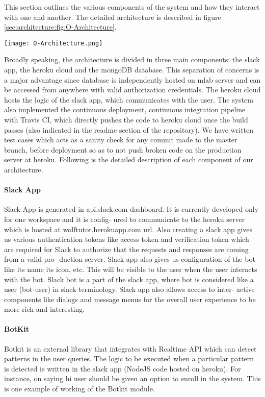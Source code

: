 This section outlines the various components of the system and how they interact with one and another. The detailed architecture is described in figure \ref{sec:architecture:fig:O-Architecture}.

\begin{figure*}[ht]
\label{sec:architecture:fig:O-Architecture}
\caption{Original Architecture Design}
\centering
\texttt{[image: O-Architecture.png]}
\end{figure*}

Broadly speaking, the architecture is divided in three main components: the slack app, the heroku cloud and the mongoDB database. This separation of concerns is a major advantage since database is independently hosted on mlab server and can be accessed from anywhere with valid authorization credentials. The heroku cloud hosts the logic of the slack app, which communicates with the user. The system also implemented the continuous deployment, continuous integration pipeline with Travis CI, which directly pushes the code to heroku cloud once the build passes (also indicated in the readme section of the repository). We have written test cases which acts as a sanity check for any commit made to the master branch, before deployment so as to not push broken code on the production server at heroku. Following is the detailed description of each component of our architecture.

\paragraph{Slack App}
Slack App is generated in api.slack.com dashboard. It is currently developed only for one workspace and it is config- ured to communicate to the heroku server which is hosted at wolftutor.herokuapp.com url. Also creating a slack app gives us various authentication tokens like access token and verification token which are required for Slack to authorize that the requests and responses are coming from a valid pro- duction server. Slack app also gives us configuration of the bot like its name its icon, etc. This will be visible to the user when the user interacts with the bot. Slack bot is a part of the slack app, where bot is considered like a user (bot-user) in slack terminology. Slack app also allows access to inter- active components like dialogs and message menus for the overall user experience to be more rich and interesting.

\paragraph{BotKit}
Botkit is an external library that integrates with Realtime API which can detect patterns in the user queries. The logic to be executed when a particular pattern is detected is written in the slack app (NodeJS code hosted on heroku). For instance, on saying hi user should be given an option to enroll in the system. This is one example of working of the Botkit module.

